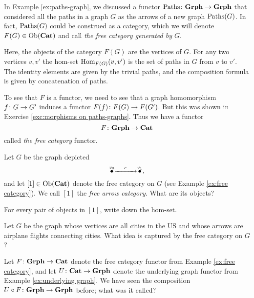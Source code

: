 \begin{example}\label{ex:free category}

In Example \ref{ex:paths-graph}, we discussed a functor $\textnormal{Paths}\colon{\bf Grph}\rightarrow{\bf Grph}$ that considered all the paths in a graph $G$ as the arrows of a new graph $\textnormal{Paths}(G)$. In fact, $\textnormal{Paths}(G)$ could be construed as a category, which we will denote $F(G)\in\textnormal{Ob}({\bf Cat})$ and call {\em the free category generated by $G$}. 

Here, the objects of the category $F(G)$ are the vertices of $G$. For any two vertices $v,v'$ the hom-set $\textnormal{Hom}_{F(G)}(v,v')$ is the set of paths in $G$ from $v$ to $v'$. The identity elements are given by the trivial paths, and the composition formula is given by concatenation of paths. 

To see that $F$ is a functor, we need to see that a graph homomorphism $f\colon G\rightarrow G'$ induces a functor $F(f)\colon F(G)\rightarrow F(G')$. But this was shown in Exercise \ref{exc:morphisms on paths-graphs}. Thus we have a functor $$F\colon{\bf Grph}\rightarrow{\bf Cat}$$ called {\em the free category} functor.

\end{example}

\begin{exercise}\label{exc:[1]}
Let $G$ be the graph depicted $$\stackrel{v_0}{\bullet}\xrightarrow{\ \ \;\;e\;\;\ \ }\stackrel{v_1}{\bullet},$$ and let $[1]\in\textnormal{Ob}({\bf Cat})$ denote the free category on $G$ (see Example \ref{ex:free category}). We call $[1]$ the {\em free arrow category}.
\sexc What are its objects?
\item For every pair of objects in $[1]$, write down the hom-set.
\endsexc
\end{exercise}

\begin{exercise}
Let $G$ be the graph whose vertices are all cities in the US and whose arrows are airplane flights connecting cities. What idea is captured by the free category on $G$?
\end{exercise}

\begin{exercise}\label{exc:free underlying cat grph}
Let $F\colon{\bf Grph}\rightarrow{\bf Cat}$ denote the free category functor from Example \ref{ex:free category}, and let $U\colon{\bf Cat}\rightarrow{\bf Grph}$ denote the underlying graph functor from Example \ref{ex:underlying graph}. We have seen the composition $U\circ F\colon{\bf Grph}\rightarrow{\bf Grph}$ before; what was it called?
\end{exercise}

